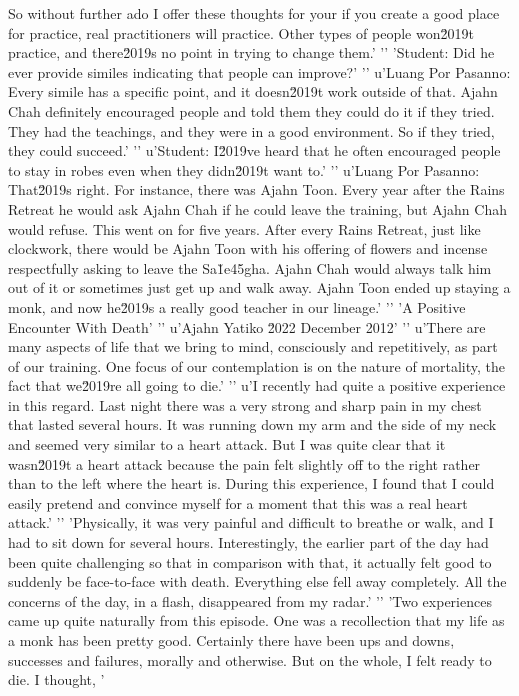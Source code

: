 So without further ado I offer these thoughts for your if you create a good place for practice, real practitioners will practice. Other types of people won\u2019t practice, and there\u2019s no point in trying to change them.'
'\n'
'Student: Did he ever provide similes indicating that people can improve?'
'\n'
u'Luang Por Pasanno: Every simile has a specific point, and it doesn\u2019t work outside of that. Ajahn Chah definitely encouraged people and told them they could do it if they tried. They had the teachings, and they were in a good environment. So if they tried, they could succeed.'
'\n'
u'Student: I\u2019ve heard that he often encouraged people to stay in robes even when they didn\u2019t want to.'
'\n'
u'Luang Por Pasanno: That\u2019s right. For instance, there was Ajahn Toon. Every year after the Rains Retreat he would ask Ajahn Chah if he could leave the training, but Ajahn Chah would refuse. This went on for five years. After every Rains Retreat, just like clockwork, there would be Ajahn Toon with his offering of flowers and incense respectfully asking to leave the Sa\u1e45gha. Ajahn Chah would always talk him out of it or sometimes just get up and walk away. Ajahn Toon ended up staying a monk, and now he\u2019s a really good teacher in our lineage.'
'\n'
'A Positive Encounter With Death'
'\n'
u'Ajahn Yatiko \u2022 December 2012'
'\n'
u'There are many aspects of life that we bring to mind, consciously and repetitively, as part of our training. One focus of our contemplation is on the nature of mortality, the fact that we\u2019re all going to die.'
'\n'
u'I recently had quite a positive experience in this regard. Last night there was a very strong and sharp pain in my chest that lasted several hours. It was running down my arm and the side of my neck and seemed very similar to a heart attack. But I was quite clear that it wasn\u2019t a heart attack because the pain felt slightly off to the right rather than to the left where the heart is. During this experience, I found that I could easily pretend and convince myself for a moment that this was a real heart attack.'
'\n'
'Physically, it was very painful and difficult to breathe or walk, and I had to sit down for several hours. Interestingly, the earlier part of the day had been quite challenging so that in comparison with that, it actually felt good to suddenly be face-to-face with death. Everything else fell away completely. All the concerns of the day, in a flash, disappeared from my radar.'
'\n'
'Two experiences came up quite naturally from this episode. One was a recollection that my life as a monk has been pretty good. Certainly there have been ups and downs, successes and failures, morally and otherwise. But on the whole, I felt ready to die. I thought, '
